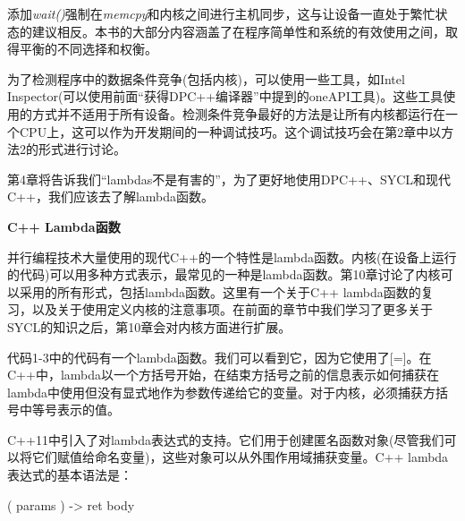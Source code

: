 添加\textit{wait()}强制在\textit{memcpy}和内核之间进行主机同步，这与让设备一直处于繁忙状态的建议相反。本书的大部分内容涵盖了在程序简单性和系统的有效使用之间，取得平衡的不同选择和权衡。\par

为了检测程序中的数据条件竞争(包括内核)，可以使用一些工具，如Intel Inspector(可以使用前面“获得DPC++编译器”中提到的oneAPI工具)。这些工具使用的方式并不适用于所有设备。检测条件竞争最好的方法是让所有内核都运行在一个CPU上，这可以作为开发期间的一种调试技巧。这个调试技巧会在第2章中以方法2的形式进行讨论。\par

\begin{tcolorbox}[colback=red!5!white,colframe=red!75!black]
第4章将告诉我们“lambdas不是有害的”，为了更好地使用DPC++、SYCL和现代C++，我们应该去了解lambda函数。
\end{tcolorbox}

\hspace*{\fill} \par %
\textbf{C++ Lambda函数}

并行编程技术大量使用的现代C++的一个特性是lambda函数。内核(在设备上运行的代码)可以用多种方式表示，最常见的一种是lambda函数。第10章讨论了内核可以采用的所有形式，包括lambda函数。这里有一个关于C++ lambda函数的复习，以及关于使用定义内核的注意事项。在前面的章节中我们学习了更多关于SYCL的知识之后，第10章会对内核方面进行扩展。\par

代码1-3中的代码有一个lambda函数。我们可以看到它，因为它使用了[=]。在C++中，lambda以一个方括号开始，在结束方括号之前的信息表示如何捕获在lambda中使用但没有显式地作为参数传递给它的变量。对于内核，必须捕获方括号中等号表示的值。\par

C++11中引入了对lambda表达式的支持。它们用于创建匿名函数对象(尽管我们可以将它们赋值给命名变量)，这些对象可以从外围作用域捕获变量。C++ lambda表达式的基本语法是：\par

\begin{tcolorbox} ( params ) -> ret { body }
\end{tcolorbox}

